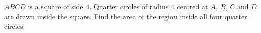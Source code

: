 $ABCD$ is a square of side $4$. Quarter circles of radius $4$ centred at $A$, $B$, $C$ and $D$ are drawn inside the square. Find the area of the region inside all four quarter circles.
